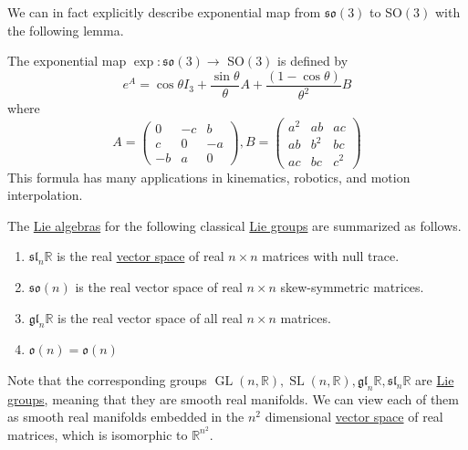 \documentclass{article}
\DeclareMathOperator{\GL}{GL}
\DeclareMathOperator{\SL}{SL}
\newcounter{theorem}[section]
\begin{document}
    We can in fact explicitly describe exponential map from $\mathfrak{so}(3)$ to SO$(3)$ with the following lemma. 

    \begin{lemma}
      \label{thm:rodrigues-formula}
      The exponential map $\exp: \mathfrak{so}(3) \rightarrow$ SO$(3)$ is defined by 
      \begin{equation}
        e^A = \cos{\theta} I_3 + \frac{\sin{\theta}}{\theta} A + \frac{(1 - \cos{\theta})}{\theta^2} B
      \end{equation}
      where 
      \begin{equation}
        A = \begin{pmatrix}
        0&-c&b\\c&0&-a\\-b&a&0
        \end{pmatrix}, B = \begin{pmatrix}
        a^2&ab&ac\\ab&b^2&bc\\ac&bc&c^2
        \end{pmatrix}
      \end{equation}
      This formula has many applications in kinematics, robotics, and motion interpolation. 
    \end{lemma}

    \begin{theorem}
      \label{thm:lie-algebras-of-the-classical-lie-groups}
    The \hyperref[def:lie-algebra]{Lie algebras} for the following classical \hyperref[def:lie-group]{Lie groups} are summarized as follows. 
    \begin{enumerate}
      \item $\mathfrak{sl}_n \mathbb{R}$ is the real \hyperref[lin-def:vector-space]{vector space} of real $n \times n$ matrices with null trace.
      \item $\mathfrak{so}(n)$ is the real vector space of real $n \times n$ skew-symmetric matrices. 
      \item $\mathfrak{gl}_n \mathbb{R}$ is the real vector space of all real $n \times n$ matrices.
      \item $\mathfrak{o}(n) = \mathfrak{o}(n)$
    \end{enumerate}
    \end{theorem}
    Note that the corresponding groups $\GL(n, \mathbb{R}), \SL(n, \mathbb{R}), \mathfrak{gl}_n \mathbb{R}, \mathfrak{sl}_n \mathbb{R}$ are \hyperref[def:lie-group]{Lie groups}, meaning that they are smooth real manifolds. We can view each of them as smooth real manifolds embedded in the $n^2$ dimensional \hyperref[lin-def:vector-space]{vector space} of real matrices, which is isomorphic to $\mathbb{R}^{n^2}$. 
\end{document}
